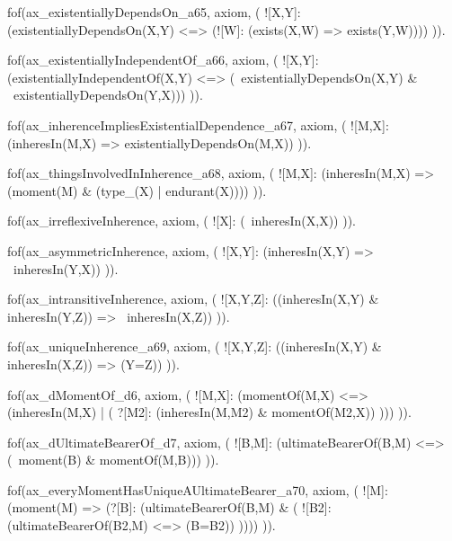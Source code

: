 fof(ax_existentiallyDependsOn_a65, axiom, (
  ![X,Y]: (existentiallyDependsOn(X,Y) <=> (![W]: (exists(X,W) => exists(Y,W))))
)).

fof(ax_existentiallyIndependentOf_a66, axiom, (
  ![X,Y]: (existentiallyIndependentOf(X,Y) <=> (~existentiallyDependsOn(X,Y) & ~existentiallyDependsOn(Y,X)))
)).






fof(ax_inherenceImpliesExistentialDependence_a67, axiom, (
  ![M,X]: (inheresIn(M,X) => existentiallyDependsOn(M,X))
)).

fof(ax_thingsInvolvedInInherence_a68, axiom, (
  ![M,X]: (inheresIn(M,X) => (moment(M) & (type_(X) | endurant(X))))
)).


fof(ax_irreflexiveInherence, axiom, (
  ![X]: (~inheresIn(X,X))
)).

fof(ax_asymmetricInherence, axiom, (
  ![X,Y]: (inheresIn(X,Y) => ~inheresIn(Y,X))
)).

fof(ax_intransitiveInherence, axiom, (
  ![X,Y,Z]: ((inheresIn(X,Y) & inheresIn(Y,Z)) => ~inheresIn(X,Z))
)).

fof(ax_uniqueInherence_a69, axiom, (
  ![X,Y,Z]: ((inheresIn(X,Y) & inheresIn(X,Z)) => (Y=Z))
)).


fof(ax_dMomentOf_d6, axiom, (
  ![M,X]: (momentOf(M,X) <=> (inheresIn(M,X) | (
    ?[M2]: (inheresIn(M,M2) & momentOf(M2,X))
  )))
)).

fof(ax_dUltimateBearerOf_d7, axiom, (
  ![B,M]: (ultimateBearerOf(B,M) <=> (~moment(B) & momentOf(M,B)))
)).

fof(ax_everyMomentHasUniqueAUltimateBearer_a70, axiom, (
  ![M]: (moment(M) => (?[B]: (ultimateBearerOf(B,M) & (
    ![B2]: (ultimateBearerOf(B2,M) <=> (B=B2))
  ))))
)).

